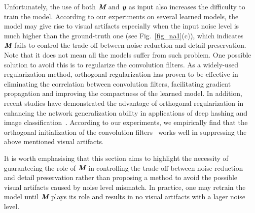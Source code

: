 \documentclass[journal]{IEEEtran}
\begin{document}
Unfortunately, the use of both $\emph{\textbf{M}}$ and $\emph{\textbf{y}}$ as input also increases the difficulty to train the model.
According to our experiments on several learned models, the model may give rise to visual artifacts especially when the input noise level is much higher than the ground-truth one (see Fig.~\ref{fig_na1}(c)), which indicates $\emph{\textbf{M}}$ fails to control the trade-off between noise reduction and detail preservation.
Note that it does not mean all the models suffer from such problem.
One possible solution to avoid this is to regularize the convolution filters. As a widely-used regularization method, orthogonal regularization has proven to be effective in eliminating the correlation between convolution filters, facilitating gradient propagation and improving the compactness of the learned model.
In addition, recent studies have demonstrated the advantage of orthogonal regularization in enhancing the network generalization ability in applications of deep hashing and image classification~\cite{wang2015deep,mhammedi2016efficient,jia2016improving,xie2017all,sun2017svdnet}.
According to our experiments, we empirically find that the orthogonal initialization of the convolution filters~\cite{jia2016improving,2015arXiv151106422M} works well in suppressing the above mentioned visual artifacts.

It is worth emphasising that this section aims to highlight the necessity of guaranteeing the role of $\emph{\textbf{M}}$ in controlling the trade-off between noise reduction and detail preservation rather than proposing a method to avoid the possible visual artifacts caused by noise level mismatch.
In practice, one may retrain the model until $\emph{\textbf{M}}$ plays its role and results in no visual artifacts with a lager noise level.
\end{document}
